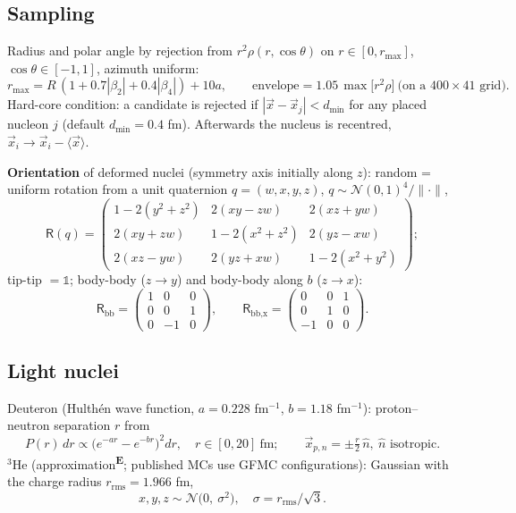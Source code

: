 \documentclass[11pt,a4paper]{article}
\newcommand{\emp}{\textsuperscript{\color{orange!80!black}\textbf{E}}}
\begin{document}
\subsection{Sampling}
Radius and polar angle by rejection from $r^2\rho(r,\cos\theta)$ on $r\in[0,r_\text{max}]$,
$\cos\theta\in[-1,1]$, azimuth uniform:
\begin{equation}
r_\text{max} = R\,(1+0.7|\beta_2|+0.4|\beta_4|) + 10a,\qquad
\text{envelope} = 1.05\,\max\!\big[r^2\rho\big]\ \text{(on a }400\times41\text{ grid)}.
\end{equation}
Hard-core condition: a candidate is rejected if $|\vec x - \vec x_j| < d_\text{min}$ for any placed nucleon $j$
(default $d_\text{min}=0.4$ fm). Afterwards the nucleus is recentred, $\vec x_i \to \vec x_i - \langle\vec x\rangle$.

\textbf{Orientation} of deformed nuclei (symmetry axis initially along $z$): random = uniform rotation from a unit
quaternion $q=(w,x,y,z)$, $q\sim\mathcal N(0,1)^4/\lVert\cdot\rVert$,
\begin{equation}
\mathsf R(q) = \begin{pmatrix}
1-2(y^2+z^2) & 2(xy-zw) & 2(xz+yw)\\
2(xy+zw) & 1-2(x^2+z^2) & 2(yz-xw)\\
2(xz-yw) & 2(yz+xw) & 1-2(x^2+y^2)\end{pmatrix};
\end{equation}
tip-tip $=\mathbb 1$; body-body ($z\to y$) and body-body along $b$ ($z\to x$):
\begin{equation}
\mathsf R_\text{bb} = \begin{pmatrix}1&0&0\\0&0&1\\0&-1&0\end{pmatrix},\qquad
\mathsf R_\text{bb,x} = \begin{pmatrix}0&0&1\\0&1&0\\-1&0&0\end{pmatrix}.
\end{equation}

\subsection{Light nuclei}
Deuteron (Hulth\'en wave function, $a=0.228$ fm$^{-1}$, $b=1.18$ fm$^{-1}$): proton--neutron separation $r$ from
\begin{equation}
P(r)\,dr \propto \big(e^{-ar}-e^{-br}\big)^2 dr,\quad r\in[0,20]~\text{fm};\qquad
\vec x_{p,n} = \pm\tfrac{r}{2}\,\hat n,\ \hat n \text{ isotropic}.
\end{equation}
$^3$He (approximation\emp; published MCs use GFMC configurations): Gaussian with the charge radius
$r_\text{rms}=1.966$ fm,
\begin{equation}
x,y,z \sim \mathcal N\!\big(0,\ \sigma^2\big),\quad \sigma = r_\text{rms}/\sqrt3 .
\end{equation}
\end{document}
